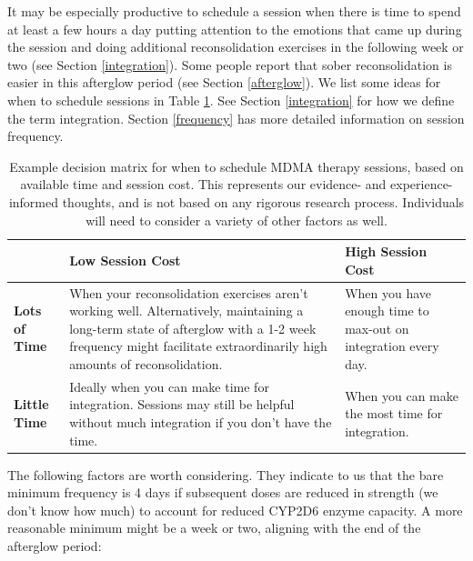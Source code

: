 \documentclass[12pt,letterpaper]{book}
\begin{document}
It may be especially productive to schedule a session when there is time to spend at least a few hours a day putting attention to the emotions that came up during the session and doing additional reconsolidation exercises in the following week or two (see Section \ref{integration}). Some people report that sober reconsolidation is easier in this afterglow period (see Section \ref{afterglow}). We list some ideas for when to schedule sessions in Table \ref{sessionDecision}. See Section \ref{integration} for how we define the term integration. Section \ref{frequency} has more detailed information on session frequency.
\FloatBarrier
\begin{table}[h]
\caption{Example decision matrix for when to schedule MDMA therapy sessions, based on available time and session cost. This represents our evidence- and experience-informed thoughts, and is not based on any rigorous research process. Individuals will need to consider a variety of other factors as well.}
\label{sessionDecision}
\centering
\begin{tabular}{|p{2.7cm}|p{6.15cm}|p{6.15cm}|}
    \hline
    & \centering\textbf{Low Session Cost} & \centering\textbf{High Session Cost} \tabularnewline
    \hline
    \centering\textbf{Lots of Time} & 
    \centering When your reconsolidation exercises aren't working well. Alternatively, maintaining a long-term state of afterglow with a 1-2 week frequency might facilitate extraordinarily high amounts of reconsolidation\footnotemark. & 
    \centering When you have enough time to max-out on integration every day. \tabularnewline
    \hline
    \centering\textbf{Little Time} & 
    \centering Ideally when you can make time for integration. Sessions may still be helpful without much integration if you don't have the time. & 
    \centering When you can make the most time for integration. \tabularnewline
    \hline
\end{tabular}
\end{table}
\FloatBarrier
{}

The following factors are worth considering. They indicate to us that the bare minimum frequency is 4 days if subsequent doses are reduced in strength (we don't know how much) to account for reduced CYP2D6 enzyme capacity. A more reasonable minimum might be a week or two, aligning with the end of the afterglow period:
\end{document}
